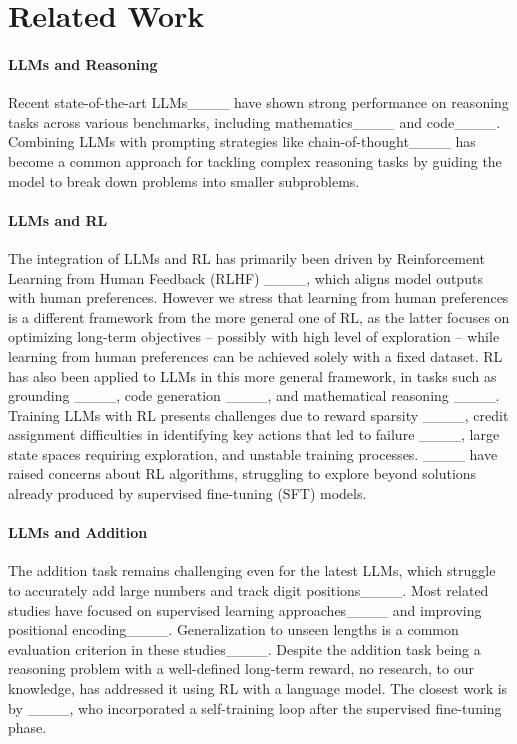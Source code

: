 \section{Related Work}
\paragraph{LLMs and Reasoning}
Recent state-of-the-art LLMs____ have shown strong performance on reasoning tasks across various benchmarks, including mathematics____ and code____. Combining LLMs with prompting strategies like chain-of-thought____ has become a common approach for tackling complex reasoning tasks by guiding the model to break down problems into smaller subproblems.

\paragraph{LLMs and RL}
The integration of LLMs and RL has primarily been driven by Reinforcement Learning from Human Feedback (RLHF) ____, which aligns model outputs with human preferences.
However we stress that learning from human preferences is a different framework from the more general one of RL, as the latter focuses on optimizing long-term objectives -- possibly with high level of exploration -- while learning from human preferences can be achieved solely with a fixed dataset.
RL has also been applied to LLMs in this more general framework, in tasks such as grounding ____, code generation ____, and mathematical reasoning ____.
Training LLMs with RL presents challenges due to reward sparsity ____, credit assignment difficulties in identifying key actions that led to failure ____, large state spaces requiring exploration, and unstable training processes. ____ have raised concerns about RL algorithms, struggling to explore beyond solutions already produced by supervised fine-tuning (SFT) models.

\paragraph{LLMs and Addition} The addition task remains challenging even for the latest LLMs, which struggle to accurately add large numbers and track digit positions____. Most related studies have focused on supervised learning approaches____ and improving positional encoding____. Generalization to unseen lengths is a common evaluation criterion in these studies____.
Despite the addition task being a reasoning problem with a well-defined long-term reward, no research, to our knowledge, has addressed it using RL with a language model.
The closest work is by ____, who incorporated a self-training loop after the supervised fine-tuning phase.

